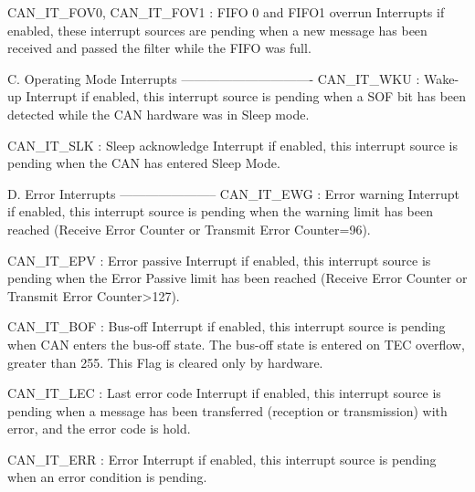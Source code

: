 \begin{DoxyVerb}
        CAN_IT_FOV0,        
        CAN_IT_FOV1    :  FIFO 0 and FIFO1 overrun Interrupts        
                          if enabled, these interrupt sources are pending when
                          a new message has been received and passed the filter
                          while the FIFO was full.

   C. Operating Mode Interrupts
  -------------------------------          
        CAN_IT_WKU     :  Wake-up Interrupt
                          if enabled, this interrupt source is pending when 
                          a SOF bit has been detected while the CAN hardware was 
                          in Sleep mode.
                                  
        CAN_IT_SLK     :  Sleep acknowledge Interrupt
                          if enabled, this interrupt source is pending when 
                          the CAN has entered Sleep Mode.       

   D. Error Interrupts 
  -----------------------         
        CAN_IT_EWG     :  Error warning Interrupt 
                          if enabled, this interrupt source is pending when
                          the warning limit has been reached (Receive Error 
                          Counter or Transmit Error Counter=96). 
                               
        CAN_IT_EPV     :  Error passive Interrupt        
                          if enabled, this interrupt source is pending when
                          the Error Passive limit has been reached (Receive 
                          Error Counter or Transmit Error Counter>127).
                          
        CAN_IT_BOF     :  Bus-off Interrupt
                          if enabled, this interrupt source is pending when
                          CAN enters the bus-off state. The bus-off state is 
                          entered on TEC overflow, greater than 255.
                          This Flag is cleared only by hardware.
                                  
        CAN_IT_LEC     :  Last error code Interrupt        
                          if enabled, this interrupt source is pending  when
                          a message has been transferred (reception or
                          transmission) with error, and the error code is hold.
                          
        CAN_IT_ERR     :  Error Interrupt
                          if enabled, this interrupt source is pending when 
                          an error condition is pending.      
                      


\end{DoxyVerb}
